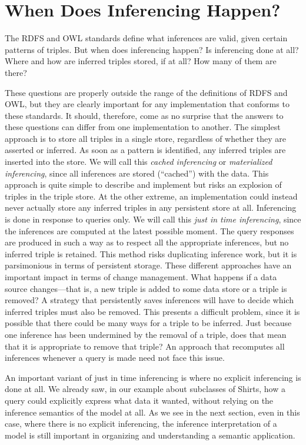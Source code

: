 \section{When Does Inferencing Happen?}

The RDFS and OWL standards define what inferences are valid, given
certain patterns of triples. But when does inferencing happen? Is
inferencing done at all? Where and how are inferred triples stored, if
at all? How many of them are there?

These questions are properly outside the range of the definitions of
RDFS and OWL, but they are clearly important for any implementation that
conforms to these standards. It should, therefore, come as no surprise
that the answers to these questions can differ from one implementation
to another. The simplest approach is to store all triples in a single
store, regardless of whether they are asserted or inferred. As soon as a
pattern is identified, any inferred triples are inserted into the store.
We will call this \emph{cached inferencing} or \emph{materialized inferencing}, 
since all inferences are
stored (``cached'') with the data. This approach is quite simple to
describe and implement but risks an explosion of triples in the triple
store. At the other extreme, an implementation could instead never
actually store any inferred triples in any persistent store at all.
Inferencing is done in response to queries only. We will call this
\emph{just in time inferencing}, since the inferences are computed at
the latest possible moment. The query responses are produced in such a
way as to respect all the appropriate inferences, but no inferred triple
is retained. This method risks duplicating inference work, but it is
parsimonious in terms of persistent storage. These different approaches
have an important impact in terms of change management. What happens if
a data source changes---that is, a new triple is added to some data
store or a triple is removed? A strategy that persistently saves
inferences will have to decide which inferred triples must also be
removed. This presents a difficult problem, since it is possible that
there could be many ways for a triple to be inferred. Just because one
inference has been undermined by the removal of a triple, does that mean
that it is appropriate to remove that triple? An approach that
recomputes all inferences whenever a query is made need not face this
issue.

An important variant of just in time inferencing is where no explicit
inferencing is done at all. We already saw, in our example about
subclasses of Shirts, how a query could explicitly express what data it
wanted, without relying on the inference semantics of the model at all.
As we see in the next section, even in this case, where there is no
explicit inferencing, the inference interpretation of a model is still
important in organizing and understanding a semantic application.


